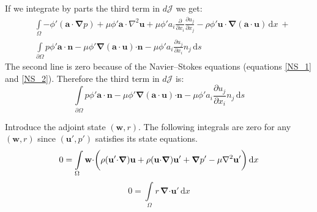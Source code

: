 \documentclass[12pt, a4paper]{article}
\begin{document}
If we integrate by parts the third term in $d \mathcal{J}$ we get:
\begin{equation}
\begin{split}
&\int\limits_{\Omega}{- \phi' (\mathbf{a \cdot} \boldsymbol{\nabla} p)} + 
{\mu \phi' \mathbf{a \cdot} \nabla^2 \mathbf{u}} + 
{\mu \phi' a_i \frac{\partial}{\partial x_i} \frac{\partial u_j}{\partial x_j}} - 
{\rho \phi' \mathbf{u \cdot} \boldsymbol{\nabla}(\mathbf{a \cdot u})}
\, \mathrm{d}x \ + \\
&\int\limits_{\partial \Omega}{p \phi' \mathbf{a \cdot n}} - 
{\mu \phi' \boldsymbol{\nabla}(\mathbf{a \cdot u}) \mathbf{\cdot n}} - 
{\mu \phi' a_i \frac{\partial u_j}{\partial x_i} n_j}
\, \mathrm{d}s
\end{split}
\end{equation}
The second line is zero because of the Navier--Stokes equations (equations \ref{NS_1} and \ref{NS_2}). Therefore the third term in $d \mathcal{J}$ is:
\begin{equation} \label{cost_change_term_3}
\int\limits_{\partial \Omega}{p \phi' \mathbf{a \cdot n}} - 
{\mu \phi' \boldsymbol{\nabla}(\mathbf{a \cdot u}) \mathbf{\cdot n}} - 
{\mu \phi' a_i \frac{\partial u_j}{\partial x_i} n_j}
\, \mathrm{d}s
\end{equation}

Introduce the adjoint state $(\mathbf{w}, r)$. The following integrals are zero for any $(\mathbf{w}, r)$ since $(\mathbf{u'}, p')$ satisfies its state equations.
\begin{equation} \label{adj_velocity_original}
0 = \int\limits_{\Omega}\mathbf{w \cdot} \bigg{(}
{\rho (\mathbf{u' \cdot} \boldsymbol{\nabla}) \mathbf{u}} + 
{\rho (\mathbf{u \cdot} \boldsymbol{\nabla}) \mathbf{u'}} + 
{\boldsymbol{\nabla} p'} - 
{\mu \nabla^2 \mathbf{u'}}
\bigg{)} \, \mathrm{d}x
\end{equation}
\begin{equation} \label{adj_pressure_original}
0 = \int\limits_{\Omega}{r \, \boldsymbol{\nabla} \mathbf{\cdot u'}} \, \mathrm{d}x
\end{equation}
\end{document}
